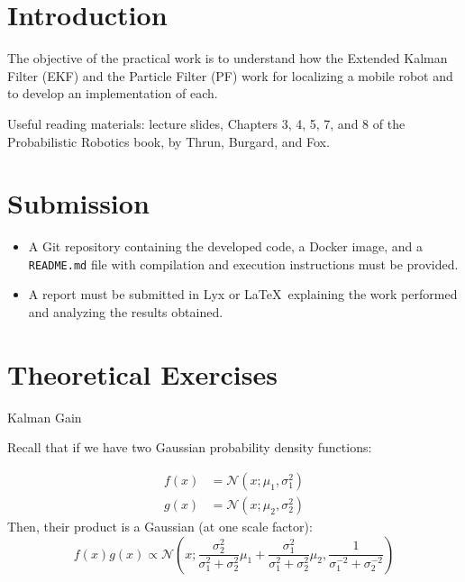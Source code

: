 \documentclass[tp]{lcc}
\begin{document}
	\maketitle
	
	
	\section{Introduction}

The objective of the practical work is to understand how the Extended Kalman Filter (EKF) and the Particle Filter (PF) work for localizing a mobile robot and to develop an implementation of each.


Useful reading materials: lecture slides, Chapters 3, 4, 5, 7, and 8 of the Probabilistic Robotics book, by Thrun, Burgard, and Fox.

\section{Submission}
\begin{itemize}
\item A Git repository containing the developed code, a Docker image, and a \lstinline{README.md} file with compilation and execution instructions must be provided.

\item A report must be submitted in Lyx or \LaTeX\ explaining the work performed and analyzing the results obtained. \end{itemize}

\section{Theoretical Exercises}

\ejercicio Kalman Gain 

Recall that if we have two Gaussian probability density functions:

\begin{align*}
f(x) &= \mathcal{N}(x;\mu_{1},\sigma_{1}^{2})\\
g(x) &= \mathcal{N}(x;\mu_{2},\sigma_{2}^{2})
\end{align*}
%
Then, their product is a Gaussian (at one scale factor):
%
\begin{equation*}
f(x)g(x) \propto \mathcal{N} \left(x; \dfrac{\sigma_{2}^{2}}{\sigma_{1}^{2} + \sigma_{2}^{2}}\mu_{1} + \dfrac{\sigma_{1}^{2}}{\sigma_{1}^{2} + \sigma_{2}^{2}}\mu_{2}, \dfrac{1}{\sigma_{1}^{-2} + \sigma_{2}^{-2}} \right)
\end{equation*}
\end{document}
